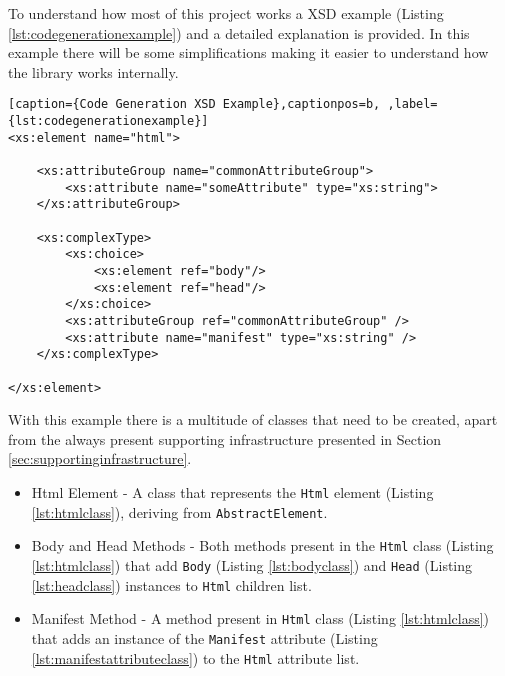 \noindent
To understand how most of this project works a \ac{XSD} example (Listing \ref{lst:codegenerationexample}) and a detailed explanation is provided. In this example there will be some simplifications making it easier to understand how the library works internally.

\bigskip


\begin{minipage}{\linewidth}
\begin{lstlisting}[caption={Code Generation XSD Example},captionpos=b, ,label={lst:codegenerationexample}]
<xs:element name="html">
    
    <xs:attributeGroup name="commonAttributeGroup">
        <xs:attribute name="someAttribute" type="xs:string">
    </xs:attributeGroup>

    <xs:complexType>
        <xs:choice>
            <xs:element ref="body"/>
            <xs:element ref="head"/>
        </xs:choice>
        <xs:attributeGroup ref="commonAttributeGroup" />
        <xs:attribute name="manifest" type="xs:string" />
    </xs:complexType>
    
</xs:element>
\end{lstlisting}
\end{minipage}

\noindent
With this example there is a multitude of classes that need to be created, apart from the always present supporting infrastructure presented in Section \ref{sec:supportinginfrastructure}. 

\begin{itemize}
	\item Html Element - A class that represents the \texttt{Html} element (Listing \ref{lst:htmlclass}), deriving from \texttt{AbstractElement}.
	\item Body and Head Methods - Both methods present in the \texttt{Html} class (Listing \ref{lst:htmlclass}) that add \texttt{Body} (Listing \ref{lst:bodyclass}) and \texttt{Head} (Listing \ref{lst:headclass}) instances to \texttt{Html} children list.
	\item Manifest Method - A method present in \texttt{Html} class (Listing \ref{lst:htmlclass}) that adds an instance of the \texttt{Manifest} attribute (Listing \ref{lst:manifestattributeclass}) to the \texttt{Html} attribute list.
\end{itemize}


